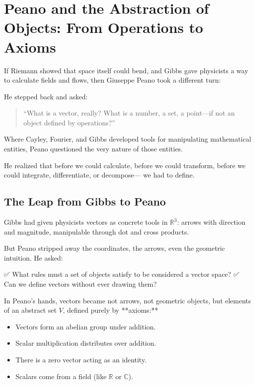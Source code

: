 \section{Peano and the Abstraction of Objects: From Operations to Axioms}

If Riemann showed that space itself could bend,  
and Gibbs gave physicists a way to calculate fields and flows,  
then Giuseppe Peano took a different turn:

He stepped back and asked:

\begin{quote}
“What is a vector, really? What is a number, a set, a point—if not an object defined by operations?”
\end{quote}

Where Cayley, Fourier, and Gibbs developed tools for manipulating mathematical entities,  
Peano questioned the very nature of those entities.

He realized that before we could calculate,  
before we could transform,  
before we could integrate, differentiate, or decompose—  
we had to define.

\bigskip

\subsection*{The Leap from Gibbs to Peano}

Gibbs had given physicists vectors as concrete tools in \( \mathbb{R}^3 \):  
arrows with direction and magnitude, manipulable through dot and cross products.

But Peano stripped away the coordinates, the arrows, even the geometric intuition.  
He asked:

✅ What rules must a set of objects satisfy to be considered a vector space?  
✅ Can we define vectors without ever drawing them?

In Peano’s hands, vectors became not arrows, not geometric objects,  
but elements of an abstract set \( V \), defined purely by **axioms:**

\begin{itemize}
  \item Vectors form an abelian group under addition.
  \item Scalar multiplication distributes over addition.
  \item There is a zero vector acting as an identity.
  \item Scalars come from a field (like \( \mathbb{R} \) or \( \mathbb{C} \)).
\end{itemize}

